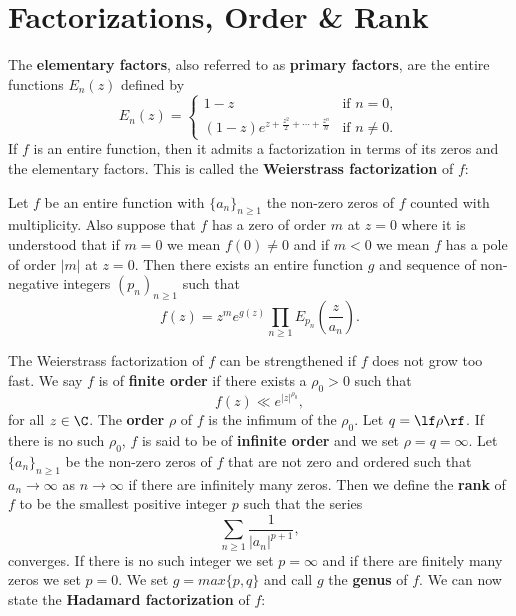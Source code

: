   \section{Factorizations, Order \& Rank}\label{append:Factorizations_and_Finite_Order}
    The \textbf{elementary factors}, also referred to as \textbf{primary factors}, are the entire functions $E_{n}(z)$ defined by
    \[
      E_{n}(z) = \begin{cases} 1-z & \text{if } n = 0, \\ (1-z)e^{z+\frac{z^{2}}{2}+\cdots+\frac{z^{n}}{n}} & \text{if } n \neq 0. \end{cases}
    \]
    If $f$ is an entire function, then it admits a factorization in terms of its zeros and the elementary factors. This is called the \textbf{Weierstrass factorization} of $f$:

    \begin{theorem}
      Let $f$ be an entire function with $\{a_{n}\}_{n \ge 1}$ the non-zero zeros of $f$ counted with multiplicity. Also suppose that $f$ has a zero of order $m$ at $z = 0$ where it is understood that if $m = 0$ we mean $f(0) \neq 0$ and if $m < 0$ we mean $f$ has a pole of order $|m|$ at $z = 0$. Then there exists an entire function $g$ and sequence of non-negative integers $(p_{n})_{n \ge 1}$ such that
      \[
        f(z) = z^{m}e^{g(z)}\prod_{n \ge 1}E_{p_{n}}\left(\frac{z}{a_{n}}\right).
      \]
    \end{theorem}

    The Weierstrass factorization of $f$ can be strengthened if $f$ does not grow too fast. We say $f$ is of \textbf{finite order} if there exists a $\rho_{0} > 0$ such that
    \[
      f(z) \ll e^{|z|^{\rho_{0}}},
    \]
    for all $z \in \C$. The \textbf{order} $\rho$ of $f$ is the infimum of the $\rho_{0}$. Let $q = \lf \rho \rf$. If there is no such $\rho_{0}$, $f$ is said to be of \textbf{infinite order} and we set $\rho = q = \infty$. Let $\{a_{n}\}_{n \ge 1}$ be the non-zero zeros of $f$ that are not zero and ordered such that $a_{n} \to \infty$ as $n \to \infty$ if there are infinitely many zeros. Then we define the \textbf{rank} of $f$ to be the smallest positive integer $p$ such that the series
    \[
      \sum_{n \ge 1}\frac{1}{|a_{n}|^{p+1}},
    \]
    converges. If there is no such integer we set $p = \infty$ and if there are finitely many zeros we set $p = 0$. We set $g = max\{p,q\}$ and call $g$ the \textbf{genus} of $f$. We can now state the \textbf{Hadamard factorization} of $f$:

